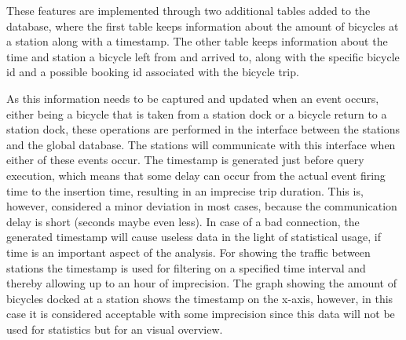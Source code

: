 These features are implemented through two additional tables added to the database, where the first table keeps information about the amount of bicycles at a station along with a timestamp. 
The other table keeps information about the time and station a bicycle left from and arrived to, along with the specific bicycle id and a possible booking id associated with the bicycle trip.

As this information needs to be captured and updated when an event occurs, either being a bicycle that is taken from a station dock or a bicycle return to a station dock, these operations are performed in the interface between the stations and the global database. 
The stations will communicate with this interface when either of these events occur. 
The timestamp is generated just before query execution, which means that some delay can occur from the actual event firing time to the insertion time, resulting in an imprecise trip duration. 
This is, however, considered a minor deviation in most cases, because the communication delay is short (seconds maybe even less).
In case of a bad connection, the generated timestamp will cause useless data in the light of statistical usage, if time is an important aspect of the analysis.
For showing the traffic between stations the timestamp is used for filtering on a specified time interval and thereby allowing up to an hour of imprecision.
The graph showing the amount of bicycles docked at a station shows the timestamp on the x-axis, however, in this case it is considered acceptable with some imprecision since this data will not be used for statistics but for an visual overview.